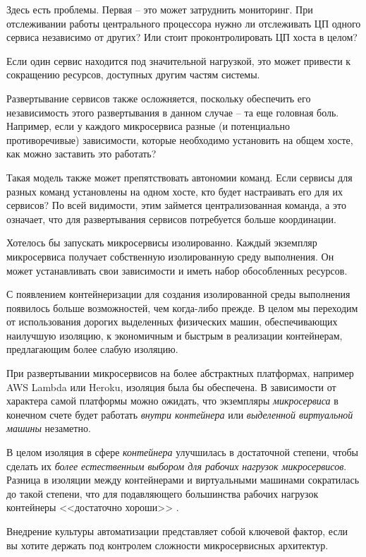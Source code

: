 \documentclass[%
	11pt,
	a4paper,
	utf8,
		]{article}
\begin{document}
Здесь есть проблемы. Первая -- это может затруднить мониторинг. При отслеживании работы центрального процессора нужно ли отслеживать ЦП одного сервиса независимо от других? Или стоит проконтролировать ЦП хоста в целом? 

Если один сервис находится под значительной нагрузкой, это может привести к сокращению ресурсов, доступных другим частям системы.

Развертывание сервисов также осложняется, поскольку обеспечить его независимость этого развертывания в данном случае -- та еще головная боль. Например, если у каждого микросервиса разные (и потенциально противоречивые) зависимости, которые необходимо установить на общем хосте, как можно заставить это работать?

Такая модель также может препятствовать автономии команд. Если сервисы для разных команд установлены на одном хосте, кто будет настраивать его для их сервисов? По всей видимости, этим займется централизованная команда, а это означает, что для развертывания сервисов потребуется больше координации.

Хотелось бы запускать микросервисы изолированно. Каждый экземпляр микросервиса получает собственную изолированную среду выполнения. Он может устанавливать свои зависимости и иметь набор обособленных ресурсов.

С появлением контейнеризации для создания изолированной среды выполнения появилось больше возможностей, чем когда-либо прежде. В целом мы переходим от использования дорогих выделенных физических машин, обеспечивающих наилучшую изоляцию, к экономичным и быстрым в реализации контейнерам, предлагающим более слабую изоляцию.

При развертывании микросервисов на более абстрактных платформах, например AWS Lambda или Heroku, изоляция была бы обеспечена. В зависимости от характера самой платформы можно ожидать, что экземпляры \emph{микросервиса} в конечном счете будет работать \emph{внутри контейнера} или \emph{выделенной виртуальной машины} незаметно.

В целом изоляция в сфере \emph{контейнера} улучшилась в достаточной степени, чтобы сделать их \emph{более естественным выбором для рабочих нагрузок микросервисов}. Разница в изоляции между контейнерами и виртуальными машинами сократилась до такой степени, что для подавляющего большинства рабочих нагрузок контейнеры <<достаточно хороши>> \cite[]{microservices-2024}.

Внедрение культуры автоматизации представляет собой ключевой фактор, если вы хотите держать под контролем сложности микросервисных архитектур.
\end{document}
